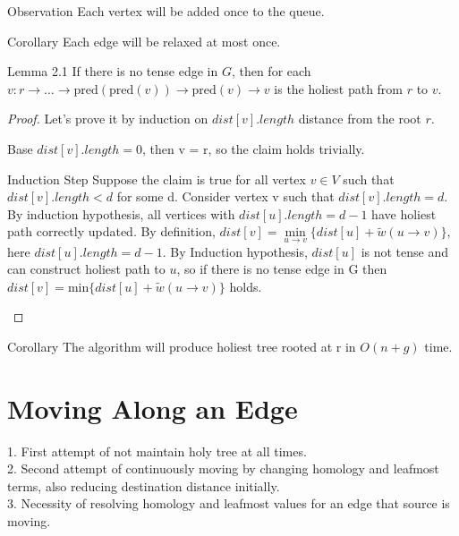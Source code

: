 \documentclass{article}
\begin{document}
\vspace{0.5cm}

\begin{oneshot}{Observation}
Each vertex will be added once to the queue.
\end{oneshot}

\begin{oneshot}{Corollary}
Each edge will be relaxed at most once.
\end{oneshot}

\begin{oneshot}{Lemma 2.1}
If there is no tense edge in $G$, then for each 
$v: r \rightarrow \ldots \rightarrow \text{pred}(\text{pred}(v)) \rightarrow 
\text{pred}(v) \rightarrow v$ is the holiest path from $r$ to $v$.
\end{oneshot}
\begin{proof}
Let's prove it by induction on $dist[v].length$ distance from the root
$r$.
\begin{oneshot}{Base}
$dist[v].length = 0$, then v = r, so the claim holds trivially.
\end{oneshot}

\begin{oneshot}{Induction Step}
Suppose the claim is true for all vertex $v \in V$ 
such that $dist[v].length < d$ for some d. Consider vertex v such that 
$dist[v].length=d$. By induction hypothesis, all vertices with 
$dist[u].length = d-1$ have holiest path 
correctly updated. By definition, $dist[v] = \min\limits_{u \rightarrow v}\{
dist[u] + \tilde w(u \rightarrow v)\}$, here $dist[u].length = d-1$. 
By Induction hypothesis, $dist[u]$ is not tense and can construct holiest 
path to $u$, so if there is no tense edge in G then 
$dist[v] = \text{min}\{dist[u] + \tilde w(u \rightarrow v)\}$ 
holds.
\end{oneshot}
\end{proof}

\begin{oneshot}{Corollary}
The algorithm will produce holiest tree rooted at r in $O(n + g)$ time.
\end{oneshot}

\section{Moving Along an Edge}
\begin{center}
{\color{red}
1. First attempt of not maintain holy tree at all times.
\\
2. Second attempt of continuously moving by changing homology and 
leafmost terms, also reducing destination distance initially.
\\ 
3. Necessity of resolving homology and leafmost values for an edge 
that source is moving.}
\end{center}
\end{document}
